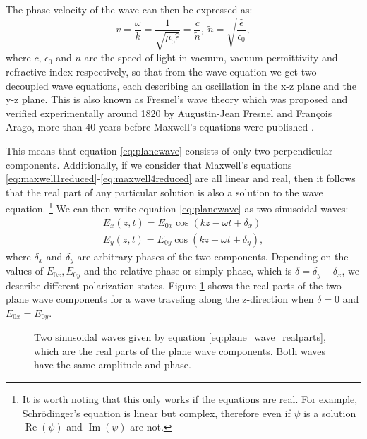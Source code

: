 The phase velocity of the wave can then be expressed as:
\begin{equation}
    v = \frac{\omega}{k} = \frac{1}{\sqrt{\mu_0 \hat{\epsilon}}} = \frac{c}{\tilde{n}},\:\tilde{n} = \sqrt{\frac{\hat{\epsilon}}{\epsilon_0}},
\end{equation}
where $c$, $\epsilon_0$ and $n$ are the speed of light in vacuum, vacuum permittivity and refractive index respectively, so that from the wave equation we get two decoupled wave equations, each describing an oscillation in the x-z plane and the y-z plane. This is also known as Fresnel's wave theory which was proposed and verified experimentally around 1820 by Augustin-Jean Fresnel and François Arago, more than 40 years before Maxwell's equations were published \cite{Collett2009,Jackson1998}.

This means that equation \ref{eq:planewave} consists of only two perpendicular components. Additionally, if we consider that Maxwell's equations \ref{eq:maxwell1reduced}-\ref{eq:maxwell4reduced} are all linear and real, then it follows that the real part of any particular solution is also a solution to the wave equation. \footnote{It is worth noting that this only works if the equations are real. For example, Schrödinger's equation is linear but complex, therefore even if $\psi$ is a solution $\operatorname{Re}(\psi)$ and $\operatorname{Im}(\psi)$ are not.} We can then write equation \ref{eq:planewave} as two sinusoidal waves:
\begin{equation}
\label{eq:plane_wave_realparts}
\begin{aligned}
    E_x(z, t) = E_{0x}\cos(kz-\omega t + \delta_x) \\
    E_y(z, t) = E_{0y}\cos(kz-\omega t + \delta_y), 
\end{aligned}
\end{equation}
where $\delta_x$ and $\delta_y$ are arbitrary phases of the two components. Depending on the values of $E_{0x}, E_{0y}$ and the relative phase or simply phase, which is $\delta = \delta_y - \delta_x$, we describe different polarization states. Figure \ref{fig:Ex_Ey_planewaves} shows the real parts of the two plane wave components for a wave traveling along the z-direction when $\delta=0$ and $E_{0x}=E_{0y}$.

\begin{figure}[h]
    \centering
    
    \caption{Two sinusoidal waves given by equation \ref{eq:plane_wave_realparts}, which are the real parts of the plane wave components. Both waves have the same amplitude and phase.}
    \label{fig:Ex_Ey_planewaves}
\end{figure}

